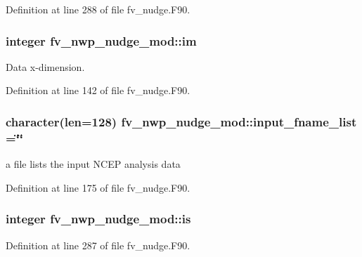 Definition at line 288 of file fv\-\_\-nudge.\-F90.

\subsubsection[{im}]{\setlength{\rightskip}{0pt plus 5cm}integer fv\-\_\-nwp\-\_\-nudge\-\_\-mod\-::im\hspace{0.3cm}{\ttfamily [private]}}\label{classfv__nwp__nudge__mod_af4efcd0125a8753cccf9edea473212fe}


Data x-\/dimension. 



Definition at line 142 of file fv\-\_\-nudge.\-F90.

\subsubsection[{input\-\_\-fname\-\_\-list}]{\setlength{\rightskip}{0pt plus 5cm}character(len=128) fv\-\_\-nwp\-\_\-nudge\-\_\-mod\-::input\-\_\-fname\-\_\-list =\char`\"{}\char`\"{}\hspace{0.3cm}{\ttfamily [private]}}\label{classfv__nwp__nudge__mod_a6c78d433ff14d2b612633c8855f85e6c}


a file lists the input N\-C\-E\-P analysis data 



Definition at line 175 of file fv\-\_\-nudge.\-F90.

\subsubsection[{is}]{\setlength{\rightskip}{0pt plus 5cm}integer fv\-\_\-nwp\-\_\-nudge\-\_\-mod\-::is\hspace{0.3cm}{\ttfamily [private]}}\label{classfv__nwp__nudge__mod_a635b34cbb0a0b285d6febfa4646c6993}


Definition at line 287 of file fv\-\_\-nudge.\-F90.

